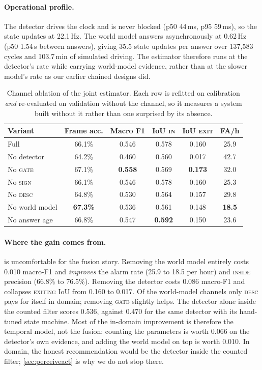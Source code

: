 \documentclass[journal]{IEEEtran}
\begin{document}
\paragraph{Operational profile.}  The detector drives the clock and is never blocked (p50 44\,ms, p95 59\,ms), so the state updates at 22.1\,Hz.  The world model answers asynchronously at 0.62\,Hz (p50 1.54\,s between answers), giving 35.5 state updates per answer over 137{,}583 cycles and 103.7\,min of simulated driving.  The estimator therefore runs at the detector's rate while carrying world-model evidence, rather than at the slower model's rate as our earlier chained designs did.

\begin{table}[t]
\centering
\caption{Channel ablation of the joint estimator.  Each row is refitted on calibration \emph{and} re-evaluated on validation without the channel, so it measures a system built without it rather than one surprised by its absence.}
\label{tab:jointablation}
\footnotesize
\setlength{\tabcolsep}{3.5pt}
\begin{tabular}{@{}lccccc@{}}
\toprule
Variant & Frame acc. & Macro F1 & IoU \textsc{in} & IoU \textsc{exit} & FA/h \\
\midrule
Full              & 66.1\% & 0.546 & 0.578 & 0.160 & 25.9 \\
No detector       & 64.2\% & 0.460 & 0.560 & 0.017 & 42.7 \\
No \textsc{gate}      & 67.1\% & \textbf{0.558} & 0.569 & \textbf{0.173} & 32.0 \\
No \textsc{sign}      & 66.1\% & 0.546 & 0.578 & 0.160 & 25.3 \\
No \textsc{desc}      & 64.8\% & 0.530 & 0.564 & 0.157 & 29.8 \\
No world model    & \textbf{67.3\%} & 0.536 & 0.561 & 0.148 & \textbf{18.5} \\
No answer age     & 66.8\% & 0.547 & \textbf{0.592} & 0.150 & 23.6 \\
\bottomrule
\end{tabular}
\end{table}

\paragraph{Where the gain comes from.}   is uncomfortable for the fusion story.  Removing the world model entirely costs 0.010 macro-F1 and \emph{improves} the alarm rate (25.9 to 18.5 per hour) and \textsc{inside} precision (66.8\% to 76.5\%).  Removing the detector costs 0.086 macro-F1 and collapses \textsc{exiting} IoU from 0.160 to 0.017.  Of the world-model channels only \textsc{desc} pays for itself in domain; removing \textsc{gate} slightly helps.  The detector alone inside the counted filter scores 0.536, against 0.470 for the same detector with its hand-tuned state machine.  Most of the in-domain improvement is therefore the temporal model, not the fusion: counting the parameters is worth 0.066 on the detector's own evidence, and adding the world model on top is worth 0.010.  In domain, the honest recommendation would be the detector inside the counted filter; \cref{sec:perceiveact} is why we do not stop there.
\end{document}
